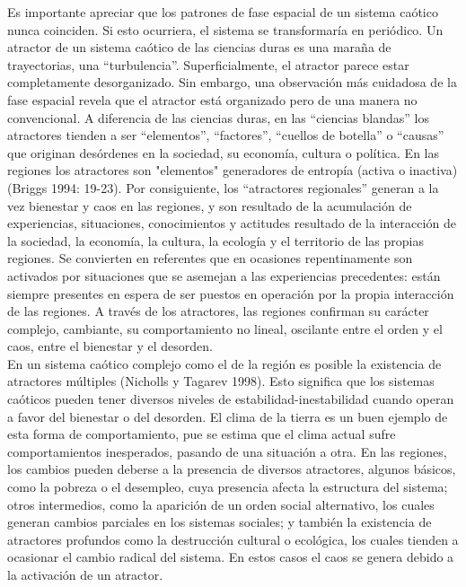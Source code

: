 \documentclass[12pt,a4paper]{book}
\begin{document}
Es importante apreciar que los patrones de fase espacial de un sistema caótico nunca coinciden. Si esto ocurriera, el sistema se transformaría en periódico. Un atractor de un sistema caótico de las ciencias duras es una maraña de trayectorias, una “turbulencia”. Superficialmente, el atractor parece estar completamente desorganizado. Sin embargo, una observación más cuidadosa de la fase espacial revela que el atractor está organizado pero de una manera no convencional. A diferencia de las ciencias duras, en las “ciencias blandas” los atractores tienden a ser “elementos”, “factores”, “cuellos de botella” o “causas” que originan desórdenes en la sociedad, su economía, cultura o política. En las regiones los atractores son "elementos" generadores de entropía (activa o inactiva) (Briggs 1994: 19-23). Por consiguiente, los “atractores regionales” generan a la vez bienestar y caos en las regiones, y son resultado de la acumulación de experiencias, situaciones, conocimientos y actitudes resultado de la interacción de la sociedad, la economía, la cultura, la ecología y el territorio de las propias regiones. Se convierten en referentes que en ocasiones repentinamente son activados por situaciones que se asemejan a las experiencias precedentes: están siempre presentes en espera de ser puestos en operación por la propia interacción de las regiones. A través de los atractores, las regiones confirman su carácter complejo, cambiante, su comportamiento no lineal, oscilante entre el orden y el caos, entre el bienestar y el desorden.
\\
En un sistema caótico complejo como el de la región es posible la existencia de atractores múltiples (Nicholls y Tagarev 1998). Esto significa que los sistemas caóticos pueden tener diversos niveles de estabilidad-inestabilidad cuando operan a favor del bienestar o del desorden. El clima de la tierra es un buen ejemplo de esta forma de comportamiento, pue se estima que el clima actual sufre comportamientos inesperados, pasando de una situación a otra. En las regiones, los cambios pueden deberse a la presencia de diversos atractores, algunos básicos, como la pobreza o el desempleo, cuya presencia afecta la estructura del sistema; otros intermedios, como la aparición de un orden social alternativo, los cuales generan cambios parciales en los sistemas sociales; y también la existencia de atractores profundos como la destrucción cultural o ecológica, los cuales tienden a ocasionar el cambio radical del sistema. En estos casos el caos se genera debido a la activación de un atractor.
	
\end{document}
